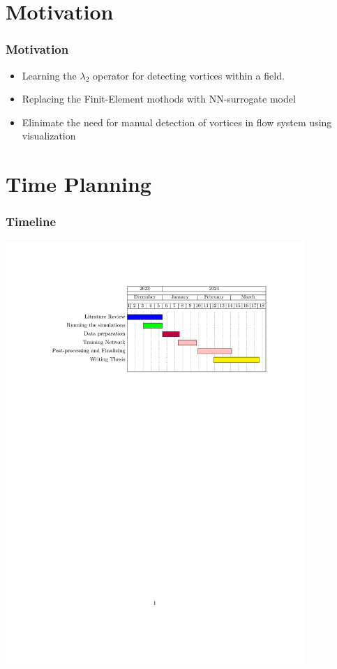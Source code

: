 \documentclass[aspectratio=169]{beamer}
\begin{document}

\section{Motivation}
\begin{frame}
  \frametitle{Motivation}
  \begin{itemize}
    \item Learning the $\lambda_{2}$ operator for detecting vortices within a field.
    \item Replacing the Finit-Element mothods with NN-surrogate model
    \item Elinimate the need for manual detection of vortices in flow system using visualization 
  \end{itemize}
\end{frame}


\section{Time Planning}
\begin{frame}
  \frametitle{Timeline}
  \begin{center}
    \includegraphics[width=0.85\textwidth, trim={3cm, 2.6cm, 2.6cm, 3cm}, clip]{Timeplan.pdf}
  \end{center} 
\end{frame}
\end{document}
